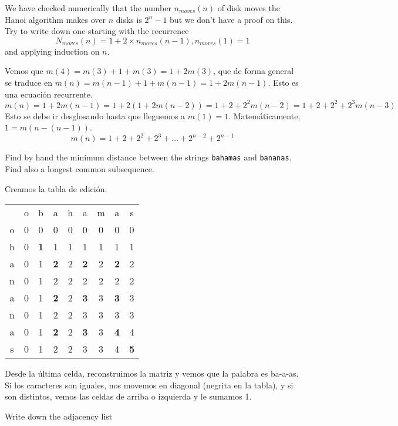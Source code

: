 \documentclass[nochap]{config/ejercicios}
\begin{document}
\begin{problemS} 
We have checked numerically that the number $n_{moves}(n)$ of disk moves the Hanoi algorithm makes over $n$ disks is $2^n - 1$ but we don't have a proof on this. Try to write down one starting with the recurrence
$$N_{moves}(n) = 1 + 2 \times n_{moves}(n - 1), n_{moves}(1) = 1$$
and applying induction on $n$.

Vemos que $m(4) = m(3) + 1 + m(3) = 1 + 2m(3)$, que de forma general se traduce en $m(n) = m(n-1) + 1 + m(n-1) = 1 + 2m(n-1)$. Esto es una ecuación recurrente.
$$m(n) = 1 + 2m(n-1) = 1 + 2( 1 + 2m(n-2)) = 1 + 2 + 2^2m(n-2) = 1 + 2 + 2^2 + 2^3m(n-3)$$
Esto se debe ir desglosando hasta que lleguemos a $m(1) = 1$. Matemáticamente, $1 = m(n-(n-1))$.
$$m(n) = 1 + 2 + 2^2 + 2^3 + \ldots + 2^{n-2} + 2^{n-1}$$
\end{problemS}

\begin{problemS} 
Find by hand the minimum distance between the strings \texttt{bahamas} and \texttt{bananas}. Find also a longest common subsequence.

Creamos la tabla de edición.
\begin{table}[h]
\centering
\begin{tabular}{c c c c c c c c c}
& o & b & a & h & a & m & a & s \\
o & 0 & 0 & 0 & 0 & 0 & 0 & 0 & 0\\
b & 0 & \textbf{1} & 1 & 1 & 1 & 1 & 1 & 1\\
a & 0 & 1 & \textbf{2} & 2 & \textbf{2} & 2 & \textbf{2} & 2\\
n & 0 & 1 & 2 & 2 & 2 & 2 & 2 & 2\\
a & 0 & 1 & \textbf{2} & 2 & \textbf{3} & 3 & \textbf{3} & 3\\
n & 0 & 1 & 2 & 2 & 3 & 3 & 3 & 3\\
a & 0 & 1 & \textbf{2} & 2 & \textbf{3} & 3 & \textbf{4} & 4\\
s & 0 & 1 & 2 & 2 & 3 & 3 & 4 & \textbf{5}\\
\end{tabular}
\end{table}
Desde la última celda, reconstruimos la matriz y vemos que la palabra es ba-a-as. Si los caracteres son iguales, nos movemos en diagonal (negrita en la tabla), y si son distintos, vemos las celdas de arriba o izquierda y le sumamos 1.
\end{problemS}

\begin{problemS} 
Write down the adjacency list
\end{problemS}
\end{document}
